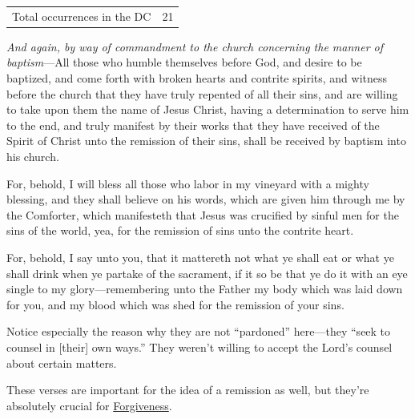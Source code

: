 		\begin{tabular}{ll}
			Total occurrences in the DC & 21
		\end{tabular}
		
		\begin{compactdesc}
			\item[DC 20:37] \textit{And again, by way of commandment to the church concerning the manner of baptism}---All those who humble themselves before God, and desire to be baptized, and come forth with broken hearts and contrite spirits, and witness before the church that they have truly repented of all their sins, and are willing to take upon them the name of Jesus Christ, having a determination to serve him to the end, and truly manifest by their works that they have received of the Spirit of Christ unto the remission of their sins, shall be received by baptism into his church.
			\item[DC 21:9] For, behold, I will bless all those who labor in my vineyard with a mighty blessing, and they shall believe on his words, which are given him through me by the Comforter, which manifesteth that Jesus was crucified by sinful men for the sins of the world, yea, for the remission of sins unto the contrite heart.
			\item[DC 27:2] For, behold, I say unto you, that it mattereth not what ye shall eat or what ye shall drink when ye partake of the sacrament, if it so be that ye do it with an eye single to my glory---remembering unto the Father my body which was laid down for you, and my blood which was shed for the remission of your sins.
			\item[{\hyperref[DC55-1]{DC 55:1}}] 
			\item[{\hyperref[DC56-14]{DC 56:14--15}}] 
				\begin{compactitem}
					\item Notice especially the reason why they are not ``pardoned'' here---they ``seek to counsel in [their] own ways.'' They weren't willing to accept the Lord's counsel about certain matters.
				\end{compactitem}
			\item[{\hyperref[DC64-3]{DC 64:3--13}}]
				\begin{compactitem}
					\item These verses are important for the idea of a remission as well, but they're absolutely crucial for \hyperref[FORGIVENESS]{Forgiveness}.
				\end{compactitem}
			\item[DC 68:27] 
			\item[DC 84:64] 
			\item[DC 132:46] 
		\end{compactdesc}
		
